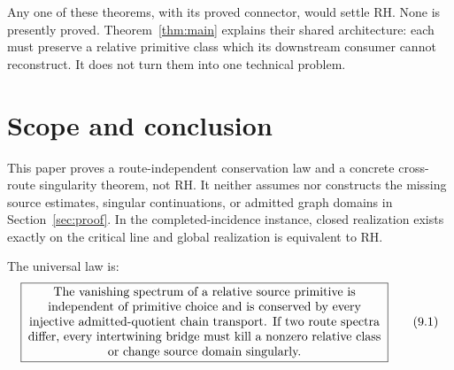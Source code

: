 \documentclass[11pt]{article}
\theoremstyle{definition}
\theoremstyle{remark}
\begin{document}
Any one of these theorems, with its proved connector, would settle RH.
None is presently proved.  Theorem~\ref{thm:main} explains their shared
architecture: each must preserve a relative primitive class which its
downstream consumer cannot reconstruct.  It does not turn them into one
technical problem.

\section{Scope and conclusion}

This paper proves a route-independent conservation law and a concrete
cross-route singularity theorem, not RH.  It neither assumes nor
constructs the missing source estimates, singular continuations, or
admitted graph domains in Section~\ref{sec:proof}.  In the
completed-incidence instance, closed realization exists exactly on the
critical line and global realization is equivalent to RH.

The universal law is:
\[
\boxed{
\begin{minipage}{0.84\linewidth}
\centering
The vanishing spectrum of a relative source primitive is independent of
primitive choice and is conserved by every injective admitted-quotient
chain transport.  If two route spectra differ, every intertwining bridge
must kill a nonzero relative class or change source domain singularly.
\end{minipage}}
\tag{9.1}\label{eq:conclusion-law}
\]
\end{document}
